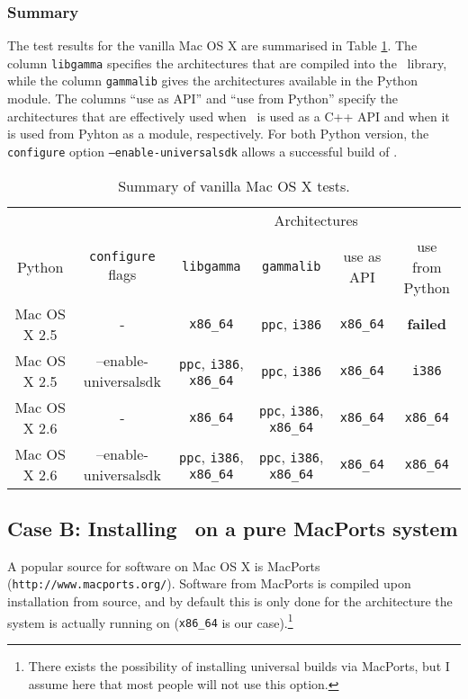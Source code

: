 \documentclass{article}[12pt,a4]
\begin{document}
\subsubsection{Summary}

The test results for the vanilla Mac OS X are summarised in Table \ref{table:vanilla}.
The column {\tt libgamma} specifies the architectures that are compiled into the \this\
library, while the column {\tt gammalib} gives the architectures available in the
Python module.
The columns ``use as API'' and ``use from Python'' specify the architectures that are effectively
used when \this\ is used as a C++ API and when it is used from Pyhton as a module, respectively.
For both Python version, the {\tt configure} option {\tt --enable-universalsdk} allows a successful
build of \this.

\begin{table}[!h]
  \small
  \center
  \begin{tabular}{cc|cccc}
  \hline
   & & \multicolumn{4}{c}{Architectures} \\
  Python & {\tt configure} flags & {\tt libgamma} & {\tt gammalib} & use as API & use from Python \\
  \hline
  Mac OS X 2.5 & - & {\tt x86\_64} & {\tt ppc}, {\tt i386} & {\tt x86\_64} & {\bf failed} \\
  Mac OS X 2.5 & --enable-universalsdk & {\tt ppc}, {\tt i386}, {\tt x86\_64} & {\tt ppc}, {\tt i386} & {\tt x86\_64} & {\tt i386} \\
  Mac OS X 2.6 & - & {\tt x86\_64} & {\tt ppc}, {\tt i386}, {\tt x86\_64} & {\tt x86\_64} & {\tt x86\_64} \\
  Mac OS X 2.6 & --enable-universalsdk & {\tt ppc}, {\tt i386}, {\tt x86\_64} & {\tt ppc}, {\tt i386}, {\tt x86\_64} & {\tt x86\_64} & {\tt x86\_64} \\
  \hline
  \end{tabular}
  \caption{Summary of vanilla Mac OS X tests.}
  \label{table:vanilla}
\end{table}


\subsection{Case B: Installing \this\ on a pure MacPorts system}

A popular source for software on Mac OS X is MacPorts ({\tt http://www.macports.org/}).
Software from MacPorts is compiled upon installation from source, and by default this is only
done for the architecture the system is actually running on ({\tt x86\_64} is our case).\footnote{
There exists the possibility of installing universal builds via MacPorts, but I assume here that 
most people will not use this option.}
\end{document}
